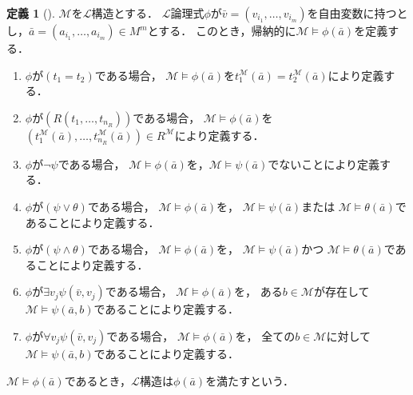 \documentclass[uplatex, dvipdfmx]{jsarticle}
\numberwithin{equation}{section}
\theoremstyle{definition}
\newtheorem{definition}{定義}[section]
\begin{document}

\begin{definition}[{\cite[Definition 1.1.6]{MR1924282}}]
     $\mathcal{M}$を$\mathcal{L}$構造とする．
     $\mathcal{L}$論理式$\phi$が$\bar{v} = (v_{i_1}, \dots, v_{i_m})$を自由変数に持つとし，$\bar{a} = (a_{i_1}, \dots, a_{i_m}) \in M^m$とする．
     このとき，帰納的に$\mathcal{M} \models \phi(\bar{a})$を定義する．
     \begin{enumerate}
          \item 
               $\phi$が$(t_1=t_2)$である場合，
               $\mathcal{M} \models \phi(\bar{a})$を$t_1^\mathcal{M}(\bar{a}) = t_2^\mathcal{M}(\bar{a})$により定義する．
          \item 
               $\phi$が$(R(t_1, \dots, t_{n_R}))$である場合，
               $\mathcal{M} \models \phi(\bar{a})$を$(t_1^\mathcal{M}(\bar{a}), \dots, t_{n_R}^\mathcal{M}(\bar{a}))\in R^\mathcal{M}$により定義する．
          \item
               $\phi$が$\lnot \psi$である場合，
               $\mathcal{M} \models \phi(\bar{a})$を，$\mathcal{M} \models \psi(\bar{a})$でないことにより定義する．
          \item
               $\phi$が$(\psi \lor \theta)$である場合，
               $\mathcal{M} \models \phi(\bar{a})$を，
               $\mathcal{M} \models \psi(\bar{a})$または
               $\mathcal{M} \models \theta(\bar{a})$であることにより定義する．
          \item
               $\phi$が$(\psi \land \theta)$である場合，
               $\mathcal{M} \models \phi(\bar{a})$を，
               $\mathcal{M} \models \psi(\bar{a})$かつ
               $\mathcal{M} \models \theta(\bar{a})$であることにより定義する．
          \item
               $\phi$が$\exists v_j\psi(\bar{v}, v_j)$である場合，
               $\mathcal{M} \models \phi(\bar{a})$を，
               ある$b \in \mathcal{M}$が存在して
               $\mathcal{M} \models \psi(\bar{a},b)$であることにより定義する．
          \item
          $\phi$が$\forall v_j\psi(\bar{v}, v_j)$である場合，
          $\mathcal{M} \models \phi(\bar{a})$を，
          全ての$b \in \mathcal{M}$に対して
          $\mathcal{M} \models \psi(\bar{a},b)$であることにより定義する．
     \end{enumerate}
     $\mathcal{M} \models \phi(\bar{a})$であるとき，$\mathcal{L}$構造は$\phi(\bar{a})$を満たすという．
\end{definition}
\end{document}
